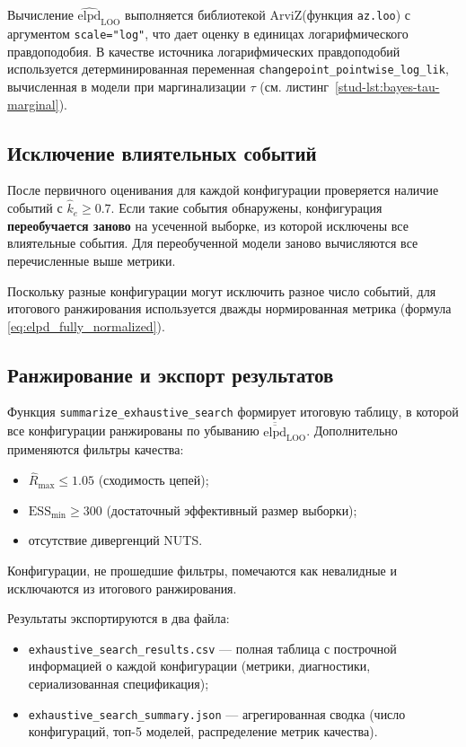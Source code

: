 \documentclass[14pt]{mmcs_article}
\begin{document}
Вычисление $\widehat{\mathrm{elpd}}_{\mathrm{LOO}}$
выполняется библиотекой ArviZ\linebreak (функция \texttt{az.loo}) с
аргументом \texttt{scale="log"}, что дает оценку в единицах
логарифмического правдоподобия. В качестве источника
логарифмических правдоподобий используется детерминированная
переменная \linebreak\texttt{changepoint\_pointwise\_log\_lik},
вычисленная в модели при маргинализации $\tau$ (см.
листинг~\ref{stud-lst:bayes-tau-marginal}).

\subsection*{Исключение влиятельных событий}

После первичного оценивания для каждой конфигурации
проверяется наличие событий с $\hat{k}_e \geq 0.7$. Если
такие события обнаружены, конфигурация \textbf{переобучается
	заново} на усеченной выборке, из которой исключены все
влиятельные события. Для переобученной модели заново
вычисляются все перечисленные выше метрики.

Поскольку разные конфигурации могут исключить разное число
событий, для итогового ранжирования используется дважды
нормированная метрика (формула \ref{eq:elpd_fully_normalized}).


\subsection*{Ранжирование и экспорт результатов}

Функция \texttt{summarize\_exhaustive\_search} формирует
итоговую таблицу, в которой все конфигурации ранжированы по
убыванию $\overline{\overline{\mathrm{elpd}}}_{\mathrm{LOO}}$.
Дополнительно применяются фильтры качества:
\begin{itemize}
	\item $\hat{R}_{\max} \leq 1.05$ (сходимость цепей);
	\item $\mathrm{ESS}_{\min} \geq 300$ (достаточный
	эффективный размер выборки);
	\item отсутствие дивергенций NUTS.
\end{itemize}
Конфигурации, не прошедшие фильтры, помечаются как
невалидные и исключаются из итогового ранжирования.

Результаты экспортируются в два файла:
\begin{itemize}
	\item \texttt{exhaustive\_search\_results.csv} — полная
	таблица с построчной информацией о каждой
	конфигурации (метрики, диагностики, сериализованная
	спецификация);
	\item \texttt{exhaustive\_search\_summary.json} —
	агрегированная сводка (число конфигураций, топ-5
	моделей, распределение метрик качества).
\end{itemize}
\end{document}
